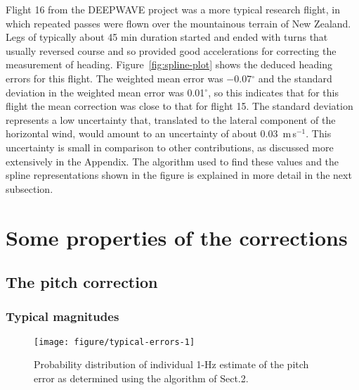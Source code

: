\documentclass[english,british,amt,bookmarks=false,unicode=true]{copernicus}\usepackage[]{graphicx}\usepackage[]{color}
\makeatletter
\def\maxwidth{ %
  \ifdim\Gin@nat@width>\linewidth
    \linewidth
  \else
    \Gin@nat@width
  \fi
}
\newenvironment{knitrout}{}{} %
\makeatother
\begin{document}
Flight 16 from the DEEPWAVE project was a more typical research flight,
in which repeated passes were flown over the mountainous terrain of
New Zealand. Legs of typically about 45 min duration started and ended
with turns that usually reversed course and so provided good accelerations
for correcting the measurement of heading. Figure~\ref{fig:spline-plot}
shows the deduced heading errors for this flight. The weighted mean
error was \ensuremath{-0.07}$^{\circ}$ and the standard deviation
in the weighted mean error was 0.01$^{\circ}$,
so this indicates that for this flight the mean correction was close
to that for flight 15. The standard deviation represents a low uncertainty
that, translated to the lateral component of the horizontal wind,
would amount to an uncertainty of about 0.03~m\,s$^{-1}$.
This uncertainty is small in comparison to other contributions, as
discussed more extensively in the Appendix. The algorithm used to
find these values and the spline representations shown in the figure
is explained in more detail in the next subsection.






\section{Some properties of the corrections}


\subsection{The pitch correction}


\subsubsection{Typical magnitudes}

\begin{knitrout}
\color{fgcolor}\begin{figure}
\texttt{[image: figure/typical-errors-1]} \caption[Probability distribution of individual 1-Hz estimate of the pitch error as determined using the algorithm of Sect]{Probability distribution of individual 1-Hz estimate of the pitch error as determined using the algorithm of Sect.2.}\label{fig:typical-errors}
\end{figure}


\end{knitrout}
\end{document}

